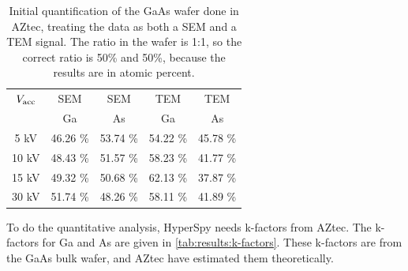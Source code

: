 \begin{table}[h]
    \centering
    \caption{
        Initial quantification of the GaAs wafer done in AZtec, treating the data as both a SEM and a TEM signal.
        The ratio in the wafer is 1:1, so the correct ratio is 50\% and 50\%, because the results are in atomic percent.
    }
    \label{tab:initial_quantification}
    \begin{tabular}{ccccc}
        $V_\textnormal{acc}$ & SEM      & SEM      & TEM      & TEM      \\
                             & Ga       & As       & Ga       & As       \\
        \hline
        5 kV                 & 46.26 \% & 53.74 \% & 54.22 \% & 45.78 \% \\
        10 kV                & 48.43 \% & 51.57 \% & 58.23 \% & 41.77 \% \\
        15 kV                & 49.32 \% & 50.68 \% & 62.13 \% & 37.87 \% \\
        30 kV                & 51.74 \% & 48.26 \% & 58.11 \% & 41.89 \%
    \end{tabular}
\end{table}

To do the quantitative analysis, HyperSpy needs k-factors from AZtec.
The k-factors for Ga and As are given in \cref{tab:results:k-factors}.
These k-factors are from the GaAs bulk wafer, and AZtec have estimated them theoretically.

